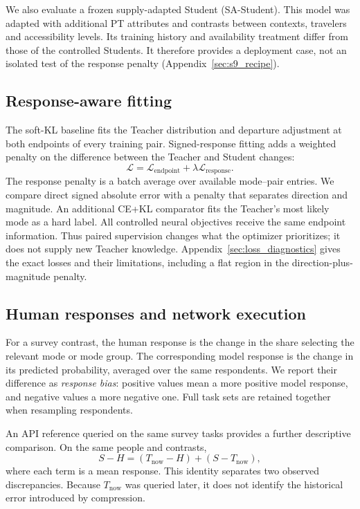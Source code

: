 We also evaluate a frozen supply-adapted Student (SA-Student). This model was adapted with additional PT attributes and contrasts between contexts, travelers and accessibility levels. Its training history and availability treatment differ from those of the controlled Students. It therefore provides a deployment case, not an isolated test of the response penalty (Appendix~\ref{sec:s9_recipe}).

\subsection{Response-aware fitting}
\label{sec:loss}
The soft-KL baseline fits the Teacher distribution and departure adjustment at both endpoints of every training pair. Signed-response fitting adds a weighted penalty on the difference between the Teacher and Student changes:
\begin{equation}
\mathcal L=\mathcal L_{\mathrm{endpoint}}+\lambda\mathcal L_{\mathrm{response}}.
\label{eq:training_objective}
\end{equation}
The response penalty is a batch average over available mode--pair entries. We compare direct signed absolute error with a penalty that separates direction and magnitude. An additional CE+KL comparator fits the Teacher's most likely mode as a hard label. All controlled neural objectives receive the same endpoint information. Thus paired supervision changes what the optimizer prioritizes; it does not supply new Teacher knowledge. Appendix~\ref{sec:loss_diagnostics} gives the exact losses and their limitations, including a flat region in the direction-plus-magnitude penalty.

\subsection{Human responses and network execution}
\label{sec:execution_method}
For a survey contrast, the human response is the change in the share selecting the relevant mode or mode group. The corresponding model response is the change in its predicted probability, averaged over the same respondents. We report their difference as \emph{response bias}: positive values mean a more positive model response, and negative values a more negative one. Full task sets are retained together when resampling respondents.

An API reference queried on the same survey tasks provides a further descriptive comparison. On the same people and contrasts,
\begin{equation}
S-H=(T_{\mathrm{now}}-H)+(S-T_{\mathrm{now}}),
\label{eq:attribution}
\end{equation}
where each term is a mean response. This identity separates two observed discrepancies. Because $T_{\mathrm{now}}$ was queried later, it does not identify the historical error introduced by compression.

